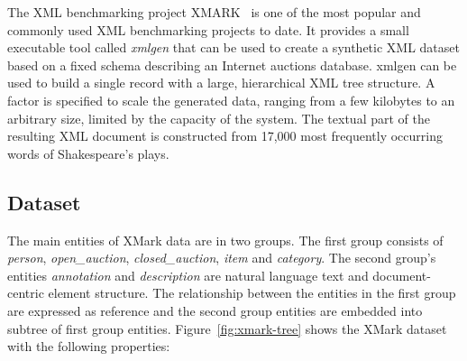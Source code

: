 The XML benchmarking project XMARK~\citep{xmark/original} is one of the most popular and commonly used XML benchmarking projects to date. It provides a small executable tool called \textit{xmlgen} that can be used to create a synthetic XML dataset based on a fixed schema describing an Internet auctions database. xmlgen can be used to build a single record with a large, hierarchical XML tree structure. A factor is specified to scale the generated data, ranging from a few kilobytes to an arbitrary size, limited by the capacity of the system. The textual part of the resulting XML document is constructed from 17,000 most frequently occurring words of Shakespeare's plays.

\subsection{Dataset}\label{xmark-dataset}
The main entities of XMark data are in two groups. The first group consists of  \textit{person}, \textit{open\_auction}, \textit{closed\_auction}, \textit{item} and \textit{category}. The second group's entities \textit{annotation} and \textit{description} are natural language text and document-centric element structure. The relationship between the entities in the first group are expressed as reference and the second group entities are embedded into subtree of first group entities. Figure~\ref{fig:xmark-tree} shows the XMark dataset with the following properties:
\label{xmark:desc:each}
